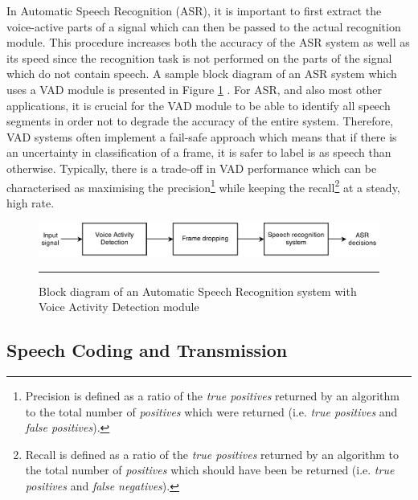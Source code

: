 In Automatic Speech Recognition (ASR), it is important to first extract the voice-active parts of a signal which can then be passed to the actual recognition module. This procedure increases both the accuracy of the ASR system as well as its speed since the recognition task is not performed on the parts of the signal which do not contain speech. A sample block diagram of an ASR system which uses a VAD module is presented in Figure \ref{fig:ASRVAD} \cite{RamirezGorriz}. For ASR, and also most other applications, it is crucial for the VAD module to be able to identify all speech segments in order not to degrade the accuracy of the entire system. Therefore, VAD systems often implement a fail-safe approach which means that if there is an uncertainty in classification of a frame, it is safer to label is as speech than otherwise. Typically, there is a trade-off in VAD performance which can be characterised as maximising the precision\footnote{Precision is defined as a ratio of the \emph{true positives} returned by an algorithm to the total number of \emph{positives} which were returned (i.e. \emph{true positives} and \emph{false positives}).} while keeping the recall\footnote{Recall is defined as a ratio of the \emph{true positives} returned by an algorithm to the total number of \emph{positives} which should have been be returned (i.e. \emph{true positives} and \emph{false negatives}).} at a steady, high rate. \bigskip

\begin{figure}[htbp]
	\centering
		\includegraphics[width=1\columnwidth]{Figures/Chapter1/ASRVAD.png}
		\rule{37em}{0.5pt}
	\caption[Block diagram of an Automatic Speech Recognition system with Voice Activity Detection module]{Block diagram of an Automatic Speech Recognition system with Voice Activity Detection module \cite{RamirezGorriz}}
	\label{fig:ASRVAD}
\end{figure}

\subsection{Speech Coding and Transmission}

